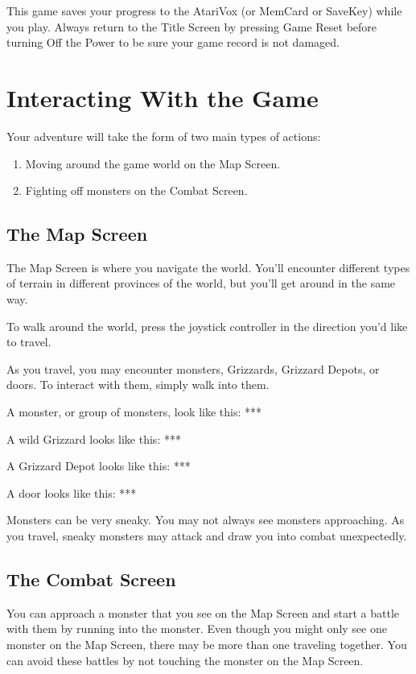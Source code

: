\documentclass[12pt,twoside,openright,book]{memoir}
\begin{document}
This game  saves your progress to  the AtariVox (or MemCard  or SaveKey)
while you play. Always return to the Title Screen by pressing Game Reset
before turning Off the Power to be sure your game record is not damaged.

\chapter{Interacting With the Game}

Your adventure will take the form of two main types of actions:

\begin{enumerate}
\item Moving around the game world on the Map Screen.
\item Fighting off monsters on the Combat Screen.
\end{enumerate}

\section{The Map Screen}

The Map Screen is where you navigate the world.  You'll encounter different
types of terrain in different provinces of the world, but you'll get around
in the same way.

To walk around the world, press the joystick controller in the direction
you'd like to travel.

As you travel,  you may encounter monsters,  Grizzards, Grizzard Depots,
or doors. To interact with them, simply walk into them.

A monster, or group of monsters, look like this: ***

A wild Grizzard looks like this: ***

A Grizzard Depot looks like this: ***

A door looks like this: ***

Monsters  can  be   very  sneaky.  You  may  not   always  see  monsters
approaching. As you travel, sneaky monsters may attack and draw you into
combat unexpectedly.

\section{The Combat Screen}

You can approach a monster that you see on the Map Screen and start a
battle with them by running into the monster. Even though you might
only see one monster on the Map Screen, there may be more than one
traveling together. You can avoid these battles by not touching the
monster on the Map Screen.
\end{document}
